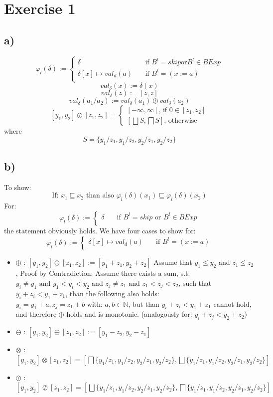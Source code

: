 \documentclass[fleqn,12pt]{article}
\begin{document}
\section*{Exercise 1}
\subsection*{a)}
\[ \varphi_l(\delta) :=
  \begin{cases}
    \delta       & \quad \text{if } B^l = skip \text{or} B^l \in BExp\\
    \delta [x] \mapsto val_d(a) & \quad \text{if } B^l=(x:=a)\\
  \end{cases}
\]
$$val_{\delta}(x):=\delta (x)$$
$$val_{\delta}(z):=[z,z]$$
$$val_{\delta}(a_1/a_2):=val_{\delta}(a_1) \oslash val_{\delta}(a_2)$$
$$[y_1,y_2] \oslash [z_1,z_2]=
	\begin{cases}
		[-\infty,\infty]\text{, if } 0 \in [z_1,z_2]\\
		[\bigsqcup S,\bigsqcap S] \text{, otherwise}
	\end{cases}$$
where $$S=\{y_1/z_1,y_1/z_2,y_2/z_1,y_2/z_2\}$$
\subsection*{b)}
To show:
$$\text{If: }x_1 \sqsubseteq x_2 \text{ than also } \varphi_l(\delta)(x_1) \sqsubseteq \varphi_l(\delta)(x_2)$$
For:
\[ \varphi_l(\delta) :=
  \begin{cases}
    \delta       & \quad \text{if } B^l = skip \text{ or } B^l \in BExp\\
  \end{cases}
\]
the statement obviously holds.
We have four cases to show for:
\[ \varphi_l(\delta) :=
  \begin{cases}
    \delta [x] \mapsto val_d(a) & \quad \text{if } B^l=(x:=a)\\
  \end{cases}
\]
\begin{itemize}
	\item{$\oplus$ :} $[y_1,y_2] \oplus [z_1,z_2] := [y_1+z_1,y_2+z_2]$ Assume that $y_1 \leq y_2$ and $z_1 \leq z_2$, Proof by Contradiction: Assume there exists a sum, s.t. $y_i \neq y_1 \text{ and } y_1<y_i<y_2$ and $z_j \neq z_1 \text{ and } z_1<z_j<z_2$, such that $y_i+z_i<y_1+z_1$, than the following also holds: $y_i=y_1+a,z_j=z_1+b \text{ with: } a,b\in \mathbb{N}$, but than $y_i+z_i<y_1+z_1$ cannot hold, and therefore $\oplus$ holds and is monotonic. (analogously for: $y_i+z_j<y_2+z_2$)
	\item{$\ominus$ :} $[y_1,y_2] \ominus [z_1,z_2] := [y_1-z_2,y_2-z_1]$
	\item{$\otimes$ :} $[y_1,y_2] \otimes [z_1,z_2]=[\bigsqcap\{y_1/z_1,y_1/z_2,y_2/z_1,y_2/z_2\},\bigsqcup\{y_1/z_1,y_1/z_2,y_2/z_1,y_2/z_2\}]$
	\item{$\oslash$ :} $[y_1,y_2] \oslash [z_1,z_2]=[\bigsqcup\{y_1/z_1,y_1/z_2,y_2/z_1,y_2/z_2\},\bigsqcap\{y_1/z_1,y_1/z_2,y_2/z_1,y_2/z_2\}]$
\end{itemize}
\end{document}
